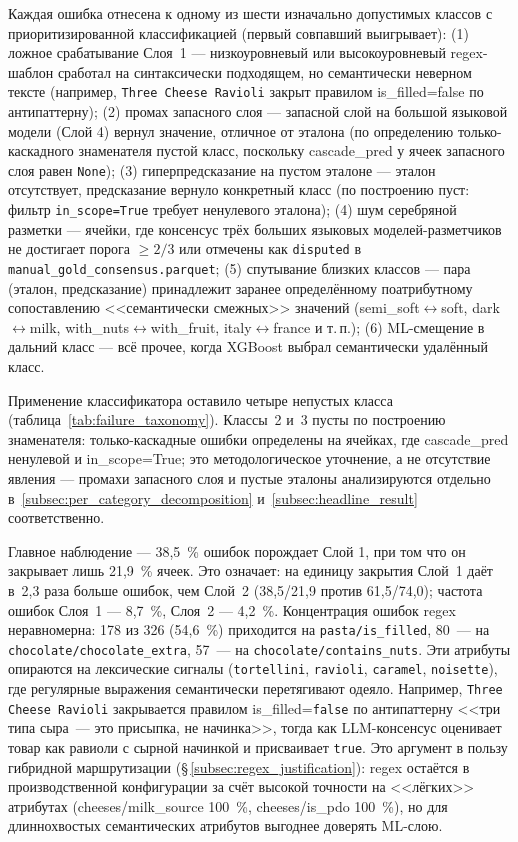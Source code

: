 Каждая ошибка отнесена к одному из шести изначально допустимых классов с приоритизированной классификацией (первый совпавший выигрывает): (1) ложное срабатывание Слоя~1 --- низкоуровневый или высокоуровневый regex-шаблон сработал на синтаксически подходящем, но семантически неверном тексте (например, \texttt{Three Cheese Ravioli} закрыт правилом is\_filled=false по антипаттерну); (2) промах запасного слоя --- запасной слой на большой языковой модели (Слой 4) вернул значение, отличное от эталона (по определению только-каскадного знаменателя пустой класс, поскольку cascade\_pred у ячеек запасного слоя равен \texttt{None}); (3) гиперпредсказание на пустом эталоне --- эталон отсутствует, предсказание вернуло конкретный класс (по построению пуст: фильтр \texttt{in\_scope=True} требует ненулевого эталона); (4) шум серебряной разметки --- ячейки, где консенсус трёх больших языковых моделей-разметчиков не достигает порога $\geqslant 2/3$ или отмечены как \texttt{disputed} в \texttt{manual\_gold\_consensus.parquet}; (5) спутывание близких классов --- пара (эталон, предсказание) принадлежит заранее определённому поатрибутному сопоставлению <<семантически смежных>> значений (semi\_soft$\leftrightarrow$soft, dark$\leftrightarrow$milk, with\_nuts$\leftrightarrow$with\_fruit, italy$\leftrightarrow$france и т.\,п.); (6) ML-смещение в дальний класс --- всё прочее, когда XGBoost выбрал семантически удалённый класс.

Применение классификатора оставило четыре непустых класса (таблица~\ref{tab:failure_taxonomy}). Классы~2 и~3 пусты по построению знаменателя: только-каскадные ошибки определены на ячейках, где cascade\_pred ненулевой и in\_scope=True; это методологическое уточнение, а не отсутствие явления --- промахи запасного слоя и пустые эталоны анализируются отдельно в~\ref{subsec:per_category_decomposition} и~\ref{subsec:headline_result} соответственно.



Главное наблюдение --- 38,5~\% ошибок порождает Слой 1, при том что он закрывает лишь 21,9~\% ячеек. Это означает: на единицу закрытия Слой~1 даёт в~2,3 раза больше ошибок, чем Слой~2 (38,5/21,9 против 61,5/74,0); частота ошибок Слоя~1 --- 8,7~\%, Слоя~2 --- 4,2~\%. Концентрация ошибок regex неравномерна: 178 из 326 (54,6~\%) приходится на \texttt{pasta/is\_filled}, 80~--- на \texttt{chocolate/chocolate\_extra}, 57~--- на \texttt{chocolate/contains\_nuts}. Эти атрибуты опираются на лексические сигналы (\texttt{tortellini}, \texttt{ravioli}, \texttt{caramel}, \texttt{noisette}), где регулярные выражения семантически перетягивают одеяло. Например, \texttt{Three Cheese Ravioli} закрывается правилом is\_filled=\texttt{false} по антипаттерну <<три типа сыра~--- это присыпка, не начинка>>, тогда как LLM-консенсус оценивает товар как равиоли с сырной начинкой и присваивает \texttt{true}. Это аргумент в пользу гибридной маршрутизации (\S\,\ref{subsec:regex_justification}): regex остаётся в производственной конфигурации за счёт высокой точности на <<лёгких>> атрибутах (cheeses/milk\_source 100~\%, cheeses/is\_pdo 100~\%), но для длиннохвостых семантических атрибутов выгоднее доверять ML-слою.


